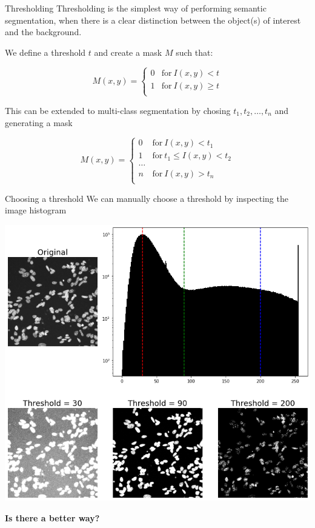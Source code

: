 \documentclass[9pt, aspectratio=169]{beamer}
\begin{document}
\begin{frame}
    {Thresholding}
    Thresholding is the simplest way of performing semantic segmentation, when there is a clear distinction between the object(s) of interest and the background.

    We define a threshold $t$ and create a mask $M$ such that:

    $$M(x, y) = \begin{cases}
            0 & \text{for}~I(x,y) < t    \\
            1 & \text{for}~I(x,y) \geq t \\
        \end{cases}$$

    \pause
    This can be extended to multi-class segmentation by chosing $t_1, t_2, \dots, t_n$ and generating a mask

    $$M(x, y) = \begin{cases}
            0 & \text{for}~I(x,y) < t_1          \\
            1 & \text{for}~t_1 \leq I(x,y) < t_2 \\
            \dots                                \\
            n & \text{for}~I(x,y) > t_n          \\
        \end{cases}$$
\end{frame}

\begin{frame}
    {Choosing a threshold}
    We can manually choose a threshold by inspecting the image histogram

    \centering
    \includegraphics[height=.75\textheight]{manual_thresholding.png}

    \pause
    \textbf{Is there a better way?}
\end{frame}
\end{document}
